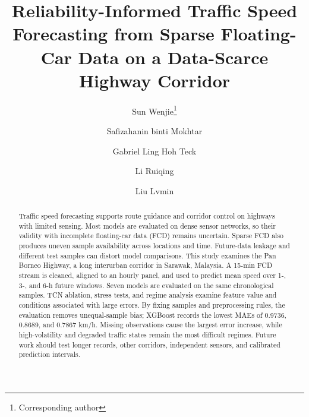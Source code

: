 \documentclass[smallcondensed]{svjour3}
\begin{document}
\title{Reliability-Informed Traffic Speed Forecasting from Sparse Floating-Car Data on a Data-Scarce Highway Corridor}

\author{
Sun Wenjie\thanks{Corresponding author}
\and
Safizahanin binti Mokhtar
\and
Gabriel Ling Hoh Teck
\and
Li Ruiqing
\and
Liu Lvmin
}



\maketitle

\begin{abstract}
Traffic speed forecasting supports route guidance and corridor control on highways with limited sensing. Most models are evaluated on dense sensor networks, so their validity with incomplete floating-car data (FCD) remains uncertain. Sparse FCD also produces uneven sample availability across locations and time. Future-data leakage and different test samples can distort model comparisons. This study examines the Pan Borneo Highway, a long interurban corridor in Sarawak, Malaysia. A 15-min FCD stream is cleaned, aligned to an hourly panel, and used to predict mean speed over 1-, 3-, and 6-h future windows. Seven models are evaluated on the same chronological samples. TCN ablation, stress tests, and regime analysis examine feature value and conditions associated with large errors. By fixing samples and preprocessing rules, the evaluation removes unequal-sample bias; XGBoost records the lowest MAEs of 0.9736, 0.8689, and 0.7867 km/h. Missing observations cause the largest error increase, while high-volatility and degraded traffic states remain the most difficult regimes. Future work should test longer records, other corridors, independent sensors, and calibrated prediction intervals.
\end{abstract}
\end{document}
